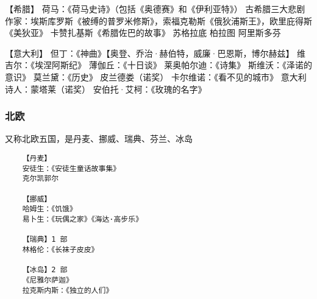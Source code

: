 \documentclass[UTF8]{../RepresentationUniverse}
\begin{document}
【希腊】
荷马：《荷马史诗》（包括《奥德赛》和《伊利亚特》）
古希腊三大悲剧作家：埃斯库罗斯《被缚的普罗米修斯》，索福克勒斯《俄狄浦斯王》，欧里庇得斯《美狄亚》
卡赞扎基斯《希腊佐巴的故事》
苏格拉底
柏拉图
阿里斯多芬


【意大利】
但丁：《神曲》【奥登、乔治·赫伯特，威廉·巴恩斯，博尔赫兹】
维吉尔：《埃涅阿斯纪》
薄伽丘：《十日谈》
莱奥帕尔迪：《诗集》
斯维沃：《泽诺的意识》
莫兰黛：《历史》
皮兰德娄（诺奖）
卡尔维诺：《看不见的城市》
意大利诗人：蒙塔莱（诺奖）
安伯托·艾柯：《玫瑰的名字》



\subsubsection{北欧}
又称北欧五国，是丹麦、挪威、瑞典、芬兰、冰岛
\begin{lstlisting}
    【丹麦】
    安徒生：《安徒生童话故事集》
    克尔凯郭尔

    【挪威】
    哈姆生：《饥饿》
    易卜生：《玩偶之家》《海达·高步乐》
    
    【瑞典】1 部
    林格伦：《长袜子皮皮》
    
    【冰岛】2 部
    《尼雅尔萨迦》
    拉克斯内斯：《独立的人们》
\end{lstlisting}
\end{document}

